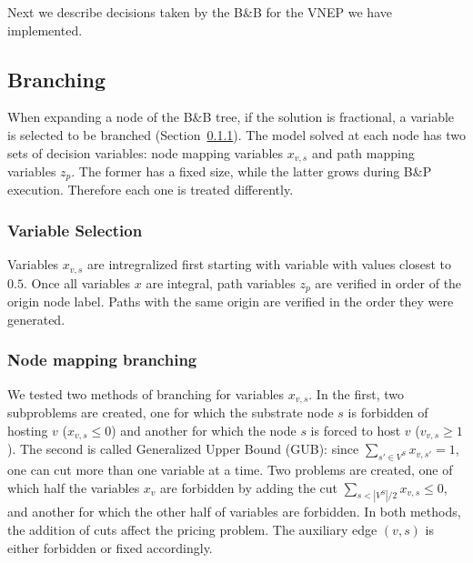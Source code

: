 \documentclass[conference]{IEEEtran}
\begin{document}
Next we describe decisions taken by the B\&B for the VNEP we have implemented.

\subsection{Branching}
\label{sec:branching}
When expanding a node of the B\&B tree, if the solution is fractional, a variable is selected to be branched (Section~\ref{sec:varsel}).
The model solved at each node has two sets of decision variables: node mapping variables $x_{v,s}$ and path mapping variables $z_{p}$.
The former has a fixed size, while the latter grows during B\&P execution.
Therefore each one is treated differently. 

\subsubsection{Variable Selection}
\label{sec:varsel}
Variables $x_{v,s}$ are intregralized first starting with variable with values closest to $0.5$.
Once all variables $x$ are integral, path variables $z_{p}$ are verified in order of the origin node label.
Paths with the same origin are verified in the order they were generated. 

\subsubsection{Node mapping branching}
We tested two methods of branching for variables $x_{v,s}$.
In the first, two subproblems are created, one for which the substrate node $s$ is forbidden of hosting $v$ ($x_{v,s} \leq 0$) and another for which the node $s$ is forced to host $v$ ($v_{v,s} \geq 1$).
The second is called Generalized Upper Bound (GUB):
since $\sum\limits_{s' \in V^S} x_{v,s'} = 1$, one can cut more than one variable at a time. Two problems are created, one of which half the variables $x_{v}$ are forbidden by adding the cut $\sum\limits_{s < |V^S| / 2} x_{v,s} \leq 0$, and another for which the other half of variables are forbidden.
In both methods, the addition of cuts affect the pricing problem.
The auxiliary edge $(v,s)$ is either forbidden or fixed accordingly.
\end{document}
